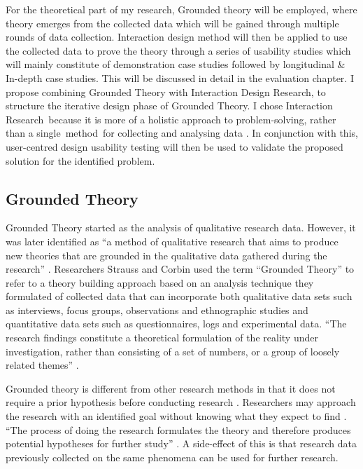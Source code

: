 For the theoretical part of my research, Grounded theory will be employed, where theory emerges from the collected data which will be gained through multiple rounds of data collection. Interaction design method will then be applied to use the collected data to prove the theory through a series of usability studies which will mainly constitute of demonstration case studies followed by longitudinal \& In-depth case studies. This will be discussed in detail in the evaluation chapter.
I propose combining Grounded Theory with Interaction Design Research, to structure the iterative design phase of Grounded Theory. I chose Interaction Research because it is more of a holistic approach to problem-solving, rather than a single method for collecting and analysing data \parencite{OBrienRoryFacultyofInformationStudies2001}. In conjunction with this, user-centred design usability testing will then be used to validate the proposed solution for the identified problem. 

\subsection{Grounded Theory} 

Grounded Theory started as the analysis of qualitative research data. However, it was later identified as ``a method of qualitative research that aims to produce new theories that are grounded in the qualitative data gathered during the research''  \parencite{Glaser1967}.
Researchers Strauss and Corbin \parencite{Strauss1990} used the term ``Grounded Theory'' to refer to a theory building approach based on an analysis technique they formulated of collected data that can incorporate both qualitative data sets such as interviews, focus groups, observations and ethnographic studies and quantitative data sets such as questionnaires, logs and experimental data. ``The research findings constitute a theoretical formulation of the reality under investigation, rather than consisting of a set of numbers, or a group of loosely related themes'' \parencite {Strauss1990}.

Grounded theory is different from other research methods in that it does not require a prior hypothesis before conducting research \parencite{Glaser1967}. Researchers may approach the research with an identified goal without knowing what they expect to find \parencite{Adams1997}. ``The process of doing the research formulates the theory and therefore produces potential hypotheses for further study'' \parencite{Adams1997}. A side-effect of this is that research data previously collected on the same phenomena can be used for further research.

